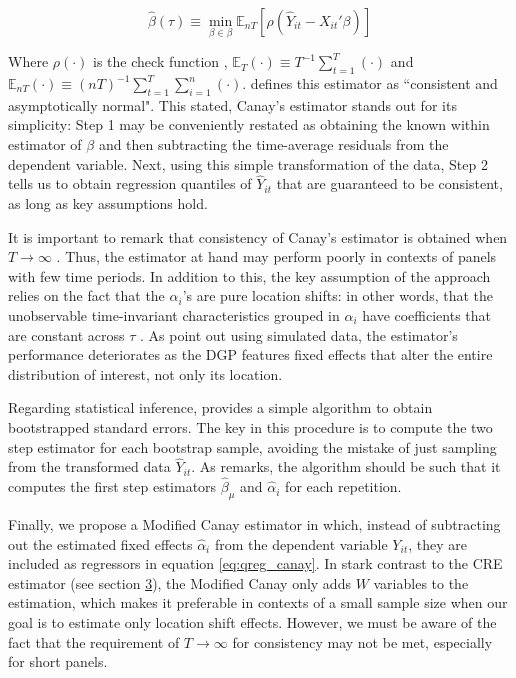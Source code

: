 \documentclass[bib]{statapress}
\begin{document}
\[\label{eq:qreg_canay}
    \hat{\beta}(\tau) \equiv \min_{\beta \in \beta} \mathbb{E}_{nT} [\rho(\hat{Y}_{it} - X_{it}' \beta)]\]

Where \(\rho(\cdot)\) is the check function \citep{koenker1978},
\(\mathbb{E}_{T}(\cdot) \equiv T^{-1} \sum_{t=1}^{T} (\cdot)\) and
\(\mathbb{E}_{nT}(\cdot) \equiv (nT)^{-1} \sum_{t=1}^{T} \sum_{i=1}^n(\cdot)\).
\citep{canay2011} defines this estimator as ``consistent and
asymptotically normal". This stated, Canay's estimator stands out for
its simplicity: Step 1 may be conveniently restated as obtaining the
known within estimator of \(\beta\) and then subtracting the
time-average residuals from the dependent variable. Next, using this
simple transformation of the data, Step 2 tells us to obtain regression
quantiles of \(\hat{Y}_{it}\) that are guaranteed to be consistent, as
long as key assumptions hold.

It is important to remark that consistency of Canay's estimator is
obtained when \(T \rightarrow \infty\) \citep{canay2011}. Thus, the
estimator at hand may perform poorly in contexts of panels with few time
periods. In addition to this, the key assumption of the approach relies
on the fact that the \(\alpha_i\)'s are pure location shifts: in other
words, that the unobservable time-invariant characteristics grouped in
\(\alpha_i\) have coefficients that are constant across \(\tau\)
\citep{canay2011}. As \citep{mss2019} point out using simulated data,
the estimator's performance deteriorates as the DGP features fixed
effects that alter the entire distribution of interest, not only its
location.

Regarding statistical inference, \citep{canay2011} provides a simple
algorithm to obtain bootstrapped standard errors. The key in this
procedure is to compute the two step estimator for each bootstrap
sample, avoiding the mistake of just sampling from the transformed data
\(\hat{Y}_{it}\). As \citep{canay2011} remarks, the algorithm should be
such that it computes the first step estimators \(\hat{\beta}_{\mu}\)
and \(\hat{\alpha}_i\) for each repetition.

Finally, we propose a Modified Canay estimator in which, instead of
subtracting out the estimated fixed effects \(\hat{\alpha}_i\) from the
dependent variable \(Y_{it}\), they are included as regressors in
equation \hyperref[eq:qreg_canay]{{[}eq:qreg\_canay{]}}. In stark
contrast to the CRE estimator (see section \hyperref[sec:cre]{3}), the
Modified Canay only adds \(W\) variables to the estimation, which makes
it preferable in contexts of a small sample size when our goal is to
estimate only location shift effects. However, we must be aware of the
fact that the requirement of \(T \rightarrow \infty\) for consistency
may not be met, especially for short panels.
\end{document}

